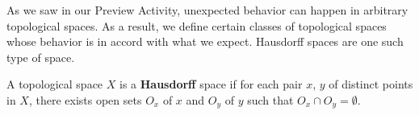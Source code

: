 \begin{comment}
Spaces in which single point sets are not closed, or in which sequences can converge to more than one point, do not generally occur in applications. Also, this type of behavior limits the results that one can prove about such spaces. As a result, we define classes of topological spaces whose behaviors are closer to what our intuition suggests. One such class is the following.

\begin{definition} A topological space $X$ is a \textbf{Hausdorff} space if for each pair $x$, $y$ of distinct points in $X$, there exists open sets $O_x$ of $x$ and $O_y$ of $y$ such that $O_x \cap O_y = \emptyset$. 
\end{definition}
In other words, a topological space is Hausdorff if we can separate distinct points with disjoint open sets.

\item 
	\ba
	\item Let $(X, d)$ be a metric space and let $x$ and $y$ be distinct elements of $X$. Is it possible to find disjoint open balls $B_x$ and $B_y$ centered at $x$ and $y$, respectively? Why or why not? Is every metric space Hausdorff?
	
	
	\item Consider $(\R, \tau_{FC})$, where $\tau_{FC}$ is the finite complement topology. Let $x$ and $y$ be distinct elements of $\R$. Suppose $O_x$ is an open set in $\R$ that contains $x$ and $O_y$ an open set in $\R$ that contains $y$. What can we say about $O_x \cap O_y$? Explain. Is $(\R, \tau_{FC})$ Hausdorff?
	
Solution. We know that $O_x \cap O_y$ is an open set, so $\R \setminus (O_x \cap O_y)$ is finite. Therefore, $O_x \cap O_y \neq \emptyset$. It follows that $(\R, \tau_{FC})$ is not Hausdorff.
		\ea
\ee


\end{comment}


\label{sec_haus_intro2}

As we saw in our Preview Activity, unexpected behavior can happen in arbitrary topological spaces. As a result, we define certain classes of topological spaces whose behavior is in accord with what we expect. Hausdorff spaces are one such type of space. 



\begin{definition} A topological space $X$ is a \textbf{Hausdorff} space if for each pair $x$, $y$ of distinct points in $X$, there exists open sets  $O_x$ of $x$ and $O_y$ of $y$ such that $O_x \cap O_y = \emptyset$.
\end{definition}



